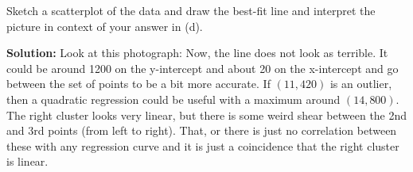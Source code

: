 Sketch a scatterplot of the data and draw the best-fit line and interpret the picture in context of your answer in (d).

\nl \textbf{Solution: } Look at this photograph:
Now, the line does not look as terrible. It could be around 1200 on the y-intercept and about 20 on the x-intercept and go between the set of points to be a bit more accurate. If $(11, 420)$ is an outlier, then a quadratic regression could be useful with a maximum around $(14,800)$. The right cluster looks very linear, but there is some weird shear between the 2nd and 3rd points (from left to right). That, or there is just no correlation between these with any regression curve and it is just a coincidence that the right cluster is linear.